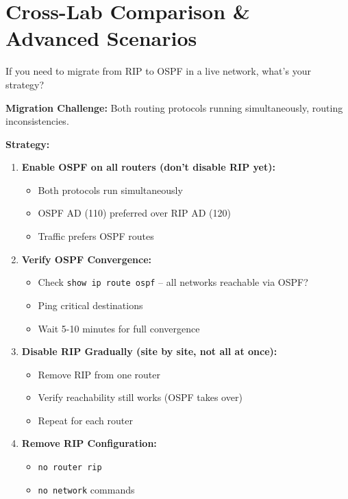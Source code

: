 \documentclass[12pt,a4paper]{article}
\begin{document}
\section{Cross-Lab Comparison \& Advanced Scenarios}

\begin{qbox}{If you need to migrate from RIP to OSPF in a live network, what's your strategy?}
\end{qbox}

\begin{abox}
\textbf{Migration Challenge:} Both routing protocols running simultaneously, routing inconsistencies.

\textbf{Strategy:}

\begin{enumerate}
    \item \textbf{Enable OSPF on all routers (don't disable RIP yet):}
    \begin{itemize}
        \item Both protocols run simultaneously
        \item OSPF AD (110) preferred over RIP AD (120)
        \item Traffic prefers OSPF routes
    \end{itemize}

    \item \textbf{Verify OSPF Convergence:}
    \begin{itemize}
        \item Check \texttt{show ip route ospf} -- all networks reachable via OSPF?
        \item Ping critical destinations
        \item Wait 5-10 minutes for full convergence
    \end{itemize}

    \item \textbf{Disable RIP Gradually (site by site, not all at once):}
    \begin{itemize}
        \item Remove RIP from one router
        \item Verify reachability still works (OSPF takes over)
        \item Repeat for each router
    \end{itemize}

    \item \textbf{Remove RIP Configuration:}
    \begin{itemize}
        \item \texttt{no router rip}
        \item \texttt{no network} commands
    \end{itemize}
\end{enumerate}


\end{abox}
\end{document}
